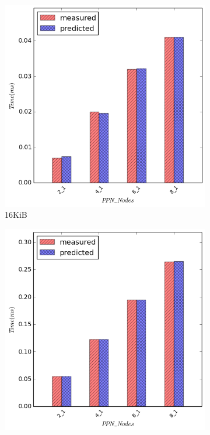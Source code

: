 \begin{figure}[H]
\begin{subfigure}[b]{0.45\textwidth}
        \includegraphics[width=\textwidth]{./images/scatter/scatter_16384}
        \caption{16KiB}
    \end{subfigure}
    \quad
        \begin{subfigure}[b]{0.45\textwidth}
        \includegraphics[width=\textwidth]{./images/scatter/scatter_262144}

\end{subfigure}
\end{figure}
